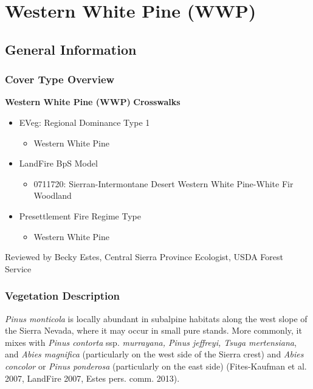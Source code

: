 \newpage
\section{Western White Pine (WWP)}
\label{wwp-description}
\subsection*{General Information}

\subsubsection{Cover Type Overview}

\textbf{Western White Pine (WWP)}
\newline
\textbf{Crosswalks}
\begin{itemize}
	\item EVeg: Regional Dominance Type 1
	\begin{itemize}
		\item Western White Pine 
	\end{itemize}

	\item LandFire BpS Model
	\begin{itemize}
		\item 0711720: Sierran-Intermontane Desert Western White Pine-White Fir Woodland
	\end{itemize}

	\item Presettlement Fire Regime Type
	\begin{itemize}
		\item Western White Pine
	\end{itemize}
\end{itemize}

\noindent Reviewed by Becky Estes, Central Sierra Province Ecologist, USDA Forest Service

\subsubsection{Vegetation Description}
\emph{Pinus monticola} is locally abundant in subalpine habitats along the west slope of the Sierra Nevada, where it may occur in small pure stands. More commonly, it mixes with \emph{Pinus contorta} ssp. \emph{murrayana, Pinus jeffreyi, Tsuga mertensiana}, and \emph{Abies magnifica} (particularly on the west side of the Sierra crest) and \emph{Abies concolor} or \emph{Pinus ponderosa} (particularly on the east side) (Fites-Kaufman et al. 2007, LandFire 2007, Estes pers. comm. 2013).

